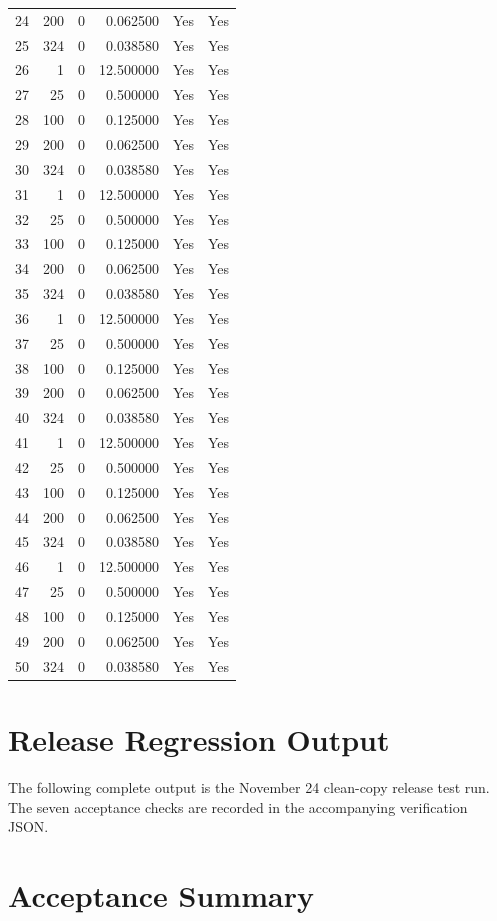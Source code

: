 \begin{longtable}{rrrrrr}
24 & 200 & 0 & 0.062500 & Yes & Yes\\
25 & 324 & 0 & 0.038580 & Yes & Yes\\
26 & 1 & 0 & 12.500000 & Yes & Yes\\
27 & 25 & 0 & 0.500000 & Yes & Yes\\
28 & 100 & 0 & 0.125000 & Yes & Yes\\
29 & 200 & 0 & 0.062500 & Yes & Yes\\
30 & 324 & 0 & 0.038580 & Yes & Yes\\
31 & 1 & 0 & 12.500000 & Yes & Yes\\
32 & 25 & 0 & 0.500000 & Yes & Yes\\
33 & 100 & 0 & 0.125000 & Yes & Yes\\
34 & 200 & 0 & 0.062500 & Yes & Yes\\
35 & 324 & 0 & 0.038580 & Yes & Yes\\
36 & 1 & 0 & 12.500000 & Yes & Yes\\
37 & 25 & 0 & 0.500000 & Yes & Yes\\
38 & 100 & 0 & 0.125000 & Yes & Yes\\
39 & 200 & 0 & 0.062500 & Yes & Yes\\
40 & 324 & 0 & 0.038580 & Yes & Yes\\
41 & 1 & 0 & 12.500000 & Yes & Yes\\
42 & 25 & 0 & 0.500000 & Yes & Yes\\
43 & 100 & 0 & 0.125000 & Yes & Yes\\
44 & 200 & 0 & 0.062500 & Yes & Yes\\
45 & 324 & 0 & 0.038580 & Yes & Yes\\
46 & 1 & 0 & 12.500000 & Yes & Yes\\
47 & 25 & 0 & 0.500000 & Yes & Yes\\
48 & 100 & 0 & 0.125000 & Yes & Yes\\
49 & 200 & 0 & 0.062500 & Yes & Yes\\
50 & 324 & 0 & 0.038580 & Yes & Yes\\
\bottomrule\end{longtable}
\section{Release Regression Output}
The following complete output is the November 24 clean-copy release test run. The seven acceptance checks are recorded in the accompanying verification JSON.

\section{Acceptance Summary}

